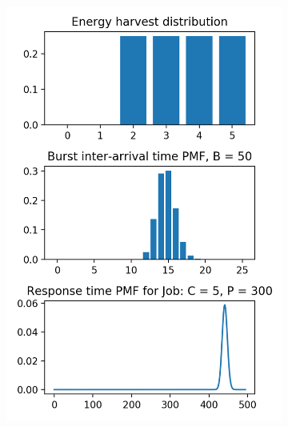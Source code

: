 \documentclass[a4paper,oneside]{csthesis}
\begin{document}
\begin{figure}[ht]
\begin{subfigure}[b]{0.45\textwidth}
        \includegraphics[width=\textwidth]{figures/energy2.png}
    \end{subfigure}
    \newline
    \newline
    \begin{subfigure}[b]{0.45\textwidth}
        \caption{}
        \label{subfig:energy3}

\end{subfigure}
\end{figure}
\end{document}
